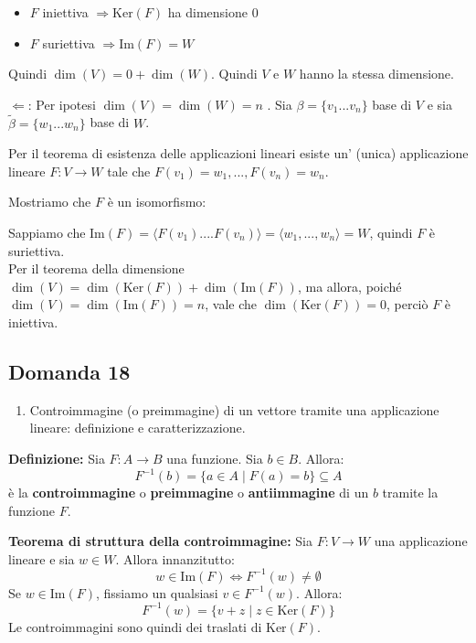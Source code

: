 \documentclass[
  a4paper,
]{article}
\providecommand{\tightlist}{%
  \setlength{\itemsep}{0pt}\setlength{\parskip}{0pt}}
\providecommand{\tightlist}{}
\begin{document}
\begin{itemize}
\tightlist
\item
  \(F\) iniettiva \(\Rightarrow \text{Ker}(F)\) ha dimensione 0
\item
  \(F\) suriettiva \(\Rightarrow \text{Im}(F) = W\)
\end{itemize}

Quindi \(\dim(V) = 0 + \dim(W)\). Quindi \(V\) e \(W\) hanno la stessa
dimensione.

\(\Leftarrow\): Per ipotesi \(\dim(V) = \dim(W) = n\) . Sia
\(\beta = \{v_1 ... v_n\}\) base di \(V\) e sia
\(\tilde{\beta} = \{w_1 ... w_n\}\) base di \(W\).

Per il teorema di esistenza delle applicazioni lineari esiste un'
(unica) applicazione lineare \(F: V \to W\) tale che
\(F(v_1) = w_1, ..., F(v_n) = w_n\).

Mostriamo che \(F\) è un isomorfismo:

Sappiamo che
\(\text{Im}(F) = \langle F(v_1) .... F(v_n) \rangle = \langle w_1, ..., w_n \rangle = W\),
quindi \(F\) è suriettiva.\\
Per il teorema della dimensione
\(\dim(V) = \dim(\text{Ker}(F)) + \dim(\text{Im}(F))\), ma allora,
poiché \(\dim(V) = \dim(\text{Im}(F)) = n\), vale che
\(\dim(\text{Ker}(F)) = 0\), perciò \(F\) è iniettiva.

\hypertarget{domanda-18}{%
\subsection{Domanda 18}\label{domanda-18}}

\begin{observationbox}[Domanda]
\begin{enumerate}
\def\labelenumi{\arabic{enumi}.}
\setcounter{enumi}{17}
\tightlist
\item
  Controimmagine (o preimmagine) di un vettore tramite una applicazione
  lineare: definizione e caratterizzazione.
\end{enumerate}
\end{observationbox}

\textbf{Definizione:} Sia \(F: A \to B\) una funzione. Sia \(b \in B\).
Allora: \[
F^{-1}(b) = \{a \in A \mid F(a) = b\} \subseteq A
\] è la \textbf{controimmagine} o \textbf{preimmagine} o
\textbf{antiimmagine} di un \(b\) tramite la funzione \(F\).

\textbf{Teorema di struttura della controimmagine:} Sia \(F : V \to W\)
una applicazione lineare e sia \(w \in W\). Allora innanzitutto: \[
w \in \text{Im}(F) \iff F^{-1}(w) \not = \emptyset
\] Se \(w \in \text{Im}(F)\), fissiamo un qualsiasi \(v \in F^{-1}(w)\).
Allora: \[
F^{-1}(w) = \{v + z \mid z \in \text{Ker}(F) \}
\] Le controimmagini sono quindi dei traslati di \(\text{Ker}(F)\).
\end{document}
